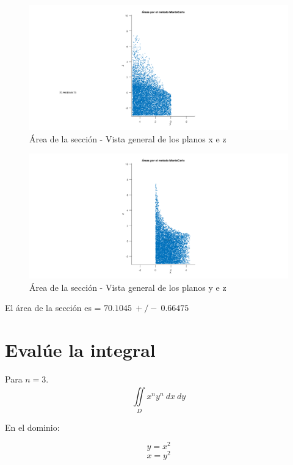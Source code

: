 \documentclass{article}
\begin{document}
\clearpage
\newpage

\begin{figure}[H]
\centering
    \includegraphics[width=1\textwidth]{images/FIG08C.png}
    \caption{Área de la sección - Vista general de los planos x e z}
\end{figure}

\begin{figure}[H]
\centering
    \includegraphics[width=1\textwidth]{images/FIG08D.png}
    \caption{Área de la sección - Vista general de los planos y e z}
\end{figure}

El área de la sección es = $70.1045~+/-~0.66475$


\section{Evalúe la integral}
Para $n=3$.
\begin{equation}
\iint \limits_{D}^{~}x^ny^n~dx~dy
\end{equation}

En el dominio:

\begin{equation}
y=x^2
\end{equation}
\begin{equation}
x=y^2
\end{equation}
\end{document}
